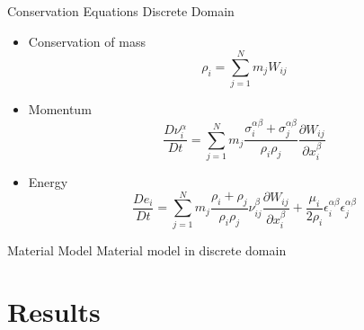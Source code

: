 \documentclass[10pt]{beamer}
\begin{document}
\begin{frame}{Conservation Equations}
Discrete Domain
\begin{itemize}
\item Conservation of mass
\[\rho_i=\sum_{j=1}^{N}{m_jW_{ij}}\]
\item Momentum
\[\frac{D\nu_i^{\alpha}}{Dt}=\sum_{j=1}^{N}{m_j\frac{\sigma_i^{\alpha\beta}+\sigma_j^{\alpha\beta}}{\rho_i\rho_j}\frac{\partial W_{ij}}{\partial x_i^\beta}}\]
\item Energy
\[\frac{De_i}{Dt}=\sum_{j=1}^{N}m_j\frac{\rho_i+\rho_j}{\rho_i\rho_j}\nu_{ij}^\beta\frac{\partial W_{ij}}{\partial x_i^\beta}+\frac{\mu_i}{2\rho_i}\epsilon_i^{\alpha\beta}\epsilon_j^{\alpha\beta}\]
\end{itemize}
\end{frame}

\begin{frame}{Material Model}
 Material model in discrete domain

\end{frame}

\section{Results}
\end{document}
